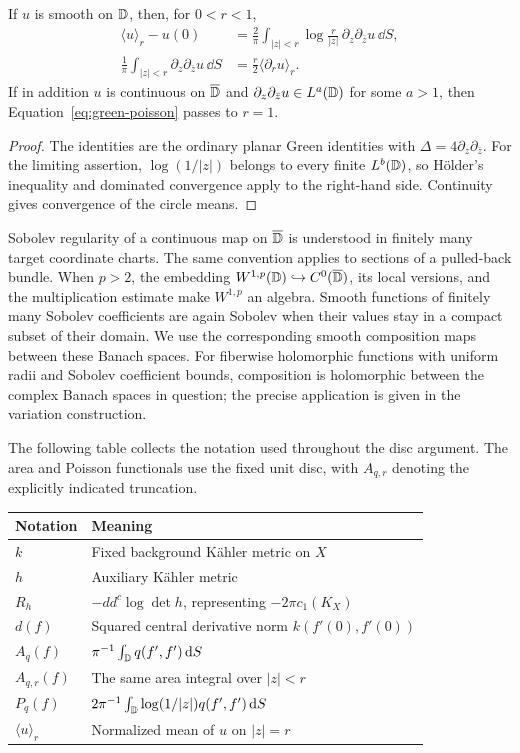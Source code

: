 \begin{lemma}\label{pre:green}
If $u$ is smooth on $\mathbb D$, then, for $0<r<1$,
\begin{align}
 \langle u\rangle_r-u(0)
 &=\frac2\pi\int_{|z|<r}\log\frac r{|z|}\,
       \partial_z\partial_{\bar z}u\,\dd S,
       \label{eq:green-poisson}\\
 \frac1\pi\int_{|z|<r}\partial_z\partial_{\bar z}u\,\dd S
 &=\frac r2\langle\partial_r u\rangle_r.
       \label{eq:green-area}
\end{align}
If in addition $u$ is continuous on $\overline{\mathbb D}$ and
$\partial_z\partial_{\bar z}u\in L^a(\mathbb D)$ for some $a>1$, then
Equation~\eqref{eq:green-poisson} passes to $r=1$.
\end{lemma}

\begin{proof}
The identities are the ordinary planar Green identities with
$\Delta=4\partial_z\partial_{\bar z}$. For the limiting assertion,
$\log(1/|z|)$ belongs to every finite $L^b(\mathbb D)$, so H\"older's
inequality and dominated convergence apply to the right-hand side.
Continuity gives convergence of the circle means.
\end{proof}

Sobolev regularity of a continuous map on $\overline{\mathbb D}$ is understood
in finitely many target coordinate charts. The same convention applies
to sections of a pulled-back bundle. When $p>2$, the embedding
$W^{1,p}(\mathbb D)\hookrightarrow C^0(\overline{\mathbb D})$, its local versions, and
the multiplication estimate make $W^{1,p}$ an algebra. Smooth
functions of finitely many Sobolev coefficients are again Sobolev
when their values stay in a compact subset of their domain. We use the
corresponding smooth composition maps between these Banach spaces.
For fiberwise holomorphic functions with uniform radii and Sobolev
coefficient bounds, composition is holomorphic between the complex
Banach spaces in question; the precise application is given in the
variation construction.

The following table collects the notation used throughout the disc
argument. The area and Poisson functionals use the fixed unit disc,
with $A_{q,r}$ denoting the explicitly indicated truncation.
\begin{center}
\begin{tabular}{@{}ll@{}}
\toprule
Notation & Meaning \\
\midrule
$k$ & Fixed background K\"ahler metric on $X$ \\
$h$ & Auxiliary K\"ahler metric \\
$R_h$ & $-dd^c\log\det h$, representing $-2\pi c_1(K_X)$ \\
$d(f)$ & Squared central derivative norm $k(f'(0),f'(0))$ \\
$A_q(f)$ & $\pi^{-1}\int_\mathbb D q(f',f')\,\mathrm d S$ \\
$A_{q,r}(f)$ & The same area integral over $|z|<r$ \\
$P_q(f)$ & $2\pi^{-1}\int_\mathbb D\log(1/|z|)q(f',f')\,\mathrm d S$ \\
$\langle u\rangle_r$ & Normalized mean of $u$ on $|z|=r$ \\
\bottomrule
\end{tabular}
\end{center}
